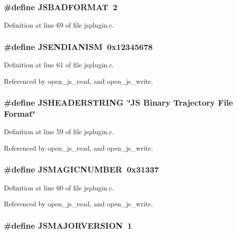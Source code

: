 \subsubsection{\setlength{\rightskip}{0pt plus 5cm}\#define JSBADFORMAT\ 2}\label{jsplugin_8c_a9}




Definition at line 69 of file jsplugin.c.
\subsubsection{\setlength{\rightskip}{0pt plus 5cm}\#define JSENDIANISM\ 0x12345678}\label{jsplugin_8c_a3}




Definition at line 61 of file jsplugin.c.

Referenced by open\_\-js\_\-read, and open\_\-js\_\-write.
\subsubsection{\setlength{\rightskip}{0pt plus 5cm}\#define JSHEADERSTRING\ \char`\"{}JS Binary Trajectory File Format\char`\"{}}\label{jsplugin_8c_a1}




Definition at line 59 of file jsplugin.c.

Referenced by open\_\-js\_\-read, and open\_\-js\_\-write.
\subsubsection{\setlength{\rightskip}{0pt plus 5cm}\#define JSMAGICNUMBER\ 0x31337}\label{jsplugin_8c_a2}




Definition at line 60 of file jsplugin.c.

Referenced by open\_\-js\_\-read, and open\_\-js\_\-write.
\subsubsection{\setlength{\rightskip}{0pt plus 5cm}\#define JSMAJORVERSION\ 1}\label{jsplugin_8c_a4}




